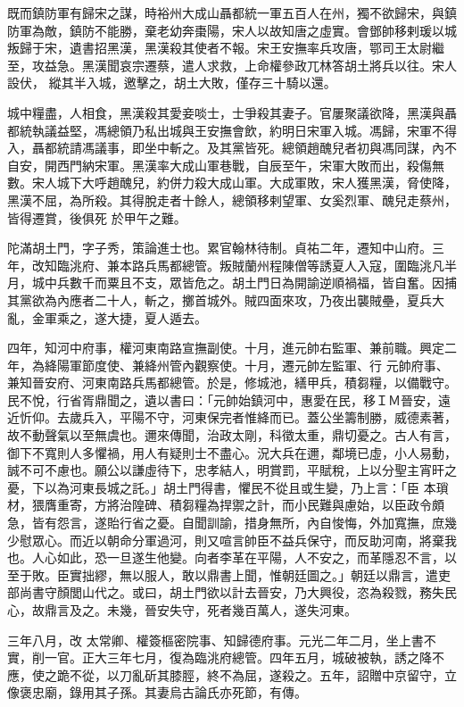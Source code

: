 \begin{pinyinscope}
 既而鎮防軍有歸宋之謀，時裕州大成山聶都統一軍五百人在州，獨不欲歸宋，與鎮防軍為敵，鎮防不能勝，棄老幼奔棗陽，宋人以故知唐之虛實。會鄧帥移剌瑗以城叛歸于宋，遺書招黑漢，黑漢殺其使者不報。宋王安撫率兵攻唐，鄂司王太尉繼至，攻益急。黑漢聞哀宗遷蔡，遣人求救，上命權參政兀林答胡土將兵以往。宋人設伏，
 縱其半入城，邀擊之，胡土大敗，僅存三十騎以還。



 城中糧盡，人相食，黑漢殺其愛妾啖士，士爭殺其妻子。官屢聚議欲降，黑漢與聶都統執議益堅，馮總領乃私出城與王安撫會飲，約明日宋軍入城。馮歸，宋軍不得入，聶都統請馮議事，即坐中斬之。及其黨皆死。總領趙醜兒者初與馮同謀，內不自安，開西門納宋軍。黑漢率大成山軍巷戰，自辰至午，宋軍大敗而出，殺傷無數。宋人城下大呼趙醜兒，約併力殺大成山軍。大成軍敗，宋人獲黑漢，脅使降，黑漢不屈，為所殺。其得脫走者十餘人，總領移剌望軍、女奚烈軍、醜兒走蔡州，皆得遷賞，後俱死
 於甲午之難。



 陀滿胡土門，字子秀，策論進士也。累官翰林待制。貞祐二年，遷知中山府。三年，改知臨洮府、兼本路兵馬都總管。叛賊蘭州程陳僧等誘夏人入寇，圍臨洮凡半月，城中兵數千而粟且不支，眾皆危之。胡土門日為開諭逆順禍福，皆自奮。因捕其黨欲為內應者二十人，斬之，擲首城外。賊四面來攻，乃夜出襲賊壘，夏兵大亂，金軍乘之，遂大捷，夏人遁去。



 四年，知河中府事，權河東南路宣撫副使。十月，進元帥右監軍、兼前職。興定二年，為絳陽軍節度使、兼絳州管內觀察使。十月，遷元帥左監軍、行
 元帥府事、兼知晉安府、河東南路兵馬都總管。於是，修城池，繕甲兵，積芻糧，以備戰守。民不悅，行省胥鼎聞之，遺以書曰：「元帥始鎮河中，惠愛在民，移ＩＭ晉安，遠近忻仰。去歲兵入，平陽不守，河東保完者惟絳而已。蓋公坐籌制勝，威德素著，故不動聲氣以至無虞也。邇來傳聞，治政太剛，科徵太重，鼎切憂之。古人有言，御下不寬則人多懼禍，用人有疑則士不盡心。況大兵在邇，鄰境已虛，小人易動，誠不可不慮也。願公以謙虛待下，忠孝結人，明賞罰，平賦稅，上以分聖主宵旰之憂，下以為河東長城之託。」胡土門得書，懼民不從且或生變，乃上言：「臣
 本瑣材，猥膺重寄，方將治隍碑、積芻糧為捍禦之計，而小民難與慮始，以臣政令頗急，皆有怨言，遂貽行省之憂。自聞訓諭，措身無所，內自悛悔，外加寬撫，庶幾少慰眾心。而近以朝命分軍過河，則又喧言帥臣不益兵保守，而反助河南，將棄我也。人心如此，恐一旦遂生他變。向者李革在平陽，人不安之，而革隱忍不言，以至于敗。臣實拙繆，無以服人，敢以鼎書上聞，惟朝廷圖之。」朝廷以鼎言，遣吏部尚書守顏閭山代之。或曰，胡土門欲以計去晉安，乃大興役，恣為殺戮，務失民心，故鼎言及之。未幾，晉安失守，死者幾百萬人，遂失河東。



 三年八月，改
 太常卿、權簽樞密院事、知歸德府事。元光二年二月，坐上書不實，削一官。正大三年七月，復為臨洮府總管。四年五月，城破被執，誘之降不應，使之跪不從，以刀亂斫其膝脛，終不為屈，遂殺之。五年，詔贈中京留守，立像褒忠廟，錄用其子孫。其妻烏古論氏亦死節，有傳。




\end{pinyinscope}
